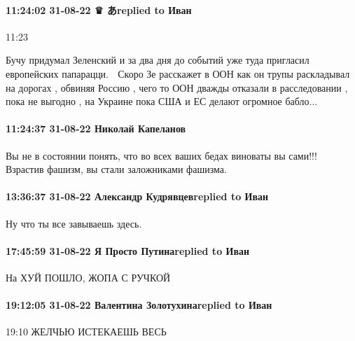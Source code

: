 \paragraph{11:24:02 31-08-22 ♛ あreplied to Иван}
11:23

Бучу придумал Зеленский и за два дня до событий уже туда пригласил европейских
папарацци. 🤣 Скоро Зе расскажет в ООН как он трупы раскладывал на дорогах ,
обвиняя Россию , чего то ООН дважды отказали в расследовании , пока не выгодно
, на Украине пока США и ЕС делают огромное бабло...

\paragraph{11:24:37 31-08-22 Николай Капеланов}

Вы не в состоянии понять, что во всех ваших бедах виноваты вы сами!!! Взрастив
фашизм, вы стали заложниками фашизма.

\paragraph{13:36:37 31-08-22 Александр Кудрявцевreplied to Иван}

Ну что ты все завываешь здесь.

\paragraph{17:45:59 31-08-22 Я Просто Путинаreplied to Иван}
На ХУЙ ПОШЛО, ЖОПА С РУЧКОЙ

\paragraph{19:12:05 31-08-22 Валентина Золотухинаreplied to Иван}
19:10
ЖЕЛЧЬЮ ИСТЕКАЕШЬ ВЕСЬ


